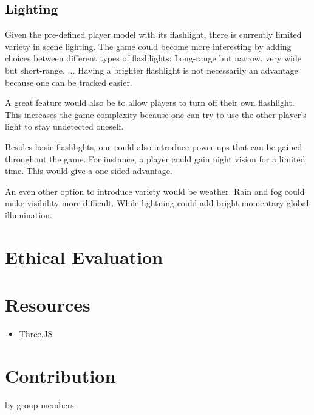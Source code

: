 \documentclass[11pt]{article}
\begin{document}
\subsection{Lighting}
\par Given the pre-defined player model with its flashlight, there is currently limited variety in scene lighting. The game could become more interesting by adding choices between different types of flashlights: Long-range but narrow, very wide but short-range, ... Having a brighter flashlight is not necessarily an advantage because one can be tracked easier.
\par A great feature would also be to allow players to turn off their own flashlight. This increases the game complexity because one can try to use the other player's light to stay undetected oneself.
\par Besides basic flashlights, one could also introduce power-ups that can be gained throughout the game. For instance, a player could gain night vision for a limited time. This would give a one-sided advantage.
\par An even other option to introduce variety would be weather. Rain and fog could make visibility more difficult. While lightning could add bright momentary global illumination.





\section{Ethical Evaluation}





\section{Resources}
\begin{itemize}
	\item Three.JS
\end{itemize}





\section{Contribution}
by group members
\end{document}
